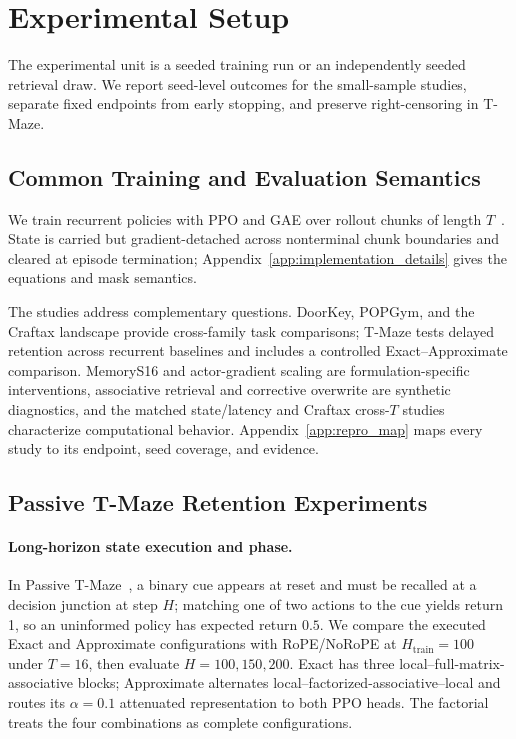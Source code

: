 \section{Experimental Setup}
\label{sec:setup}

The experimental unit is a seeded training run or an independently seeded retrieval draw. We report seed-level outcomes for the small-sample studies, separate fixed endpoints from early stopping, and preserve right-censoring in T-Maze.

\subsection{Common Training and Evaluation Semantics}

We train recurrent policies with PPO and GAE over rollout chunks of length $T$~\cite{schulman2015high,schulman2017proximal}. State is carried but gradient-detached across nonterminal chunk boundaries and cleared at episode termination; Appendix~\ref{app:implementation_details} gives the equations and mask semantics.

The studies address complementary questions. DoorKey, POPGym, and the Craftax landscape provide cross-family task comparisons; T-Maze tests delayed retention across recurrent baselines and includes a controlled Exact--Approximate comparison. MemoryS16 and actor-gradient scaling are formulation-specific interventions, associative retrieval and corrective overwrite are synthetic diagnostics, and the matched state/latency and Craftax cross-$T$ studies characterize computational behavior. Appendix~\ref{app:repro_map} maps every study to its endpoint, seed coverage, and evidence.

\subsection{Passive T-Maze Retention Experiments}

\paragraph{Long-horizon state execution and phase.}
In Passive T-Maze~\cite{ni2023when}, a binary cue appears at reset and must be recalled at a decision junction at step $H$; matching one of two actions to the cue yields return 1, so an uninformed policy has expected return $0.5$. We compare the executed Exact and Approximate configurations with RoPE/NoRoPE at $H_{\mathrm{train}}=100$ under $T=16$, then evaluate $H=100,150,200$. Exact has three local--full-matrix-associative blocks; Approximate alternates local--factorized-associative--local and routes its $\alpha=0.1$ attenuated representation to both PPO heads. The factorial treats the four combinations as complete configurations.

